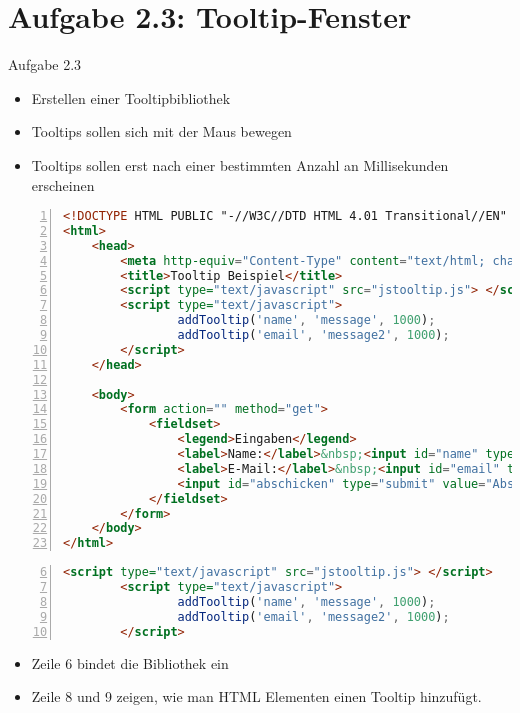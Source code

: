 \section{Aufgabe 2.3: Tooltip-Fenster}
\begin{frame}[<+->]{Aufgabe 2.3}
\normalsize
\begin{itemize}
\item Erstellen einer Tooltipbibliothek
\item Tooltips sollen sich mit der Maus bewegen
\item Tooltips sollen erst nach einer bestimmten Anzahl an Millisekunden erscheinen
\end{itemize}
\end{frame}
\tiny{\begin{lstlisting}[language = HTML,
                                   mathescape = true, 
                   breaklines=true, 
                   numbers = left, 
                   numbersep = 3pt]
<!DOCTYPE HTML PUBLIC "-//W3C//DTD HTML 4.01 Transitional//EN" "http://www.w3.org/TR/html4/loose.dtd">
<html>
    <head>
        <meta http-equiv="Content-Type" content="text/html; charset=utf-8">
        <title>Tooltip Beispiel</title>
        <script type="text/javascript" src="jstooltip.js"> </script>
        <script type="text/javascript">
                addTooltip('name', 'message', 1000);
                addTooltip('email', 'message2', 1000);
        </script>
    </head>
    
    <body>
		<form action="" method="get">
			<fieldset>
            	<legend>Eingaben</legend>
                <label>Name:</label>&nbsp;<input id="name" type="text"><br>
                <label>E-Mail:</label>&nbsp;<input id="email" type="text">
                <input id="abschicken" type="submit" value="Abschicken">
			</fieldset>
		</form>    	
    </body>
</html>
\end{lstlisting}
}
\normalsize
\begin{frame}[fragile,<+->]
\tiny{\begin{lstlisting}[language = HTML,
			numbers=left,
			firstnumber=6,
			numbersep = 3pt]
        <script type="text/javascript" src="jstooltip.js"> </script>
        <script type="text/javascript">
                addTooltip('name', 'message', 1000);
                addTooltip('email', 'message2', 1000);
        </script>
\end{lstlisting}}
\begin{itemize}
\normalsize
\item Zeile 6 bindet die Bibliothek ein
\item Zeile 8 und 9 zeigen, wie man HTML Elementen einen Tooltip hinzufügt.
\end{itemize}
\end{frame}
